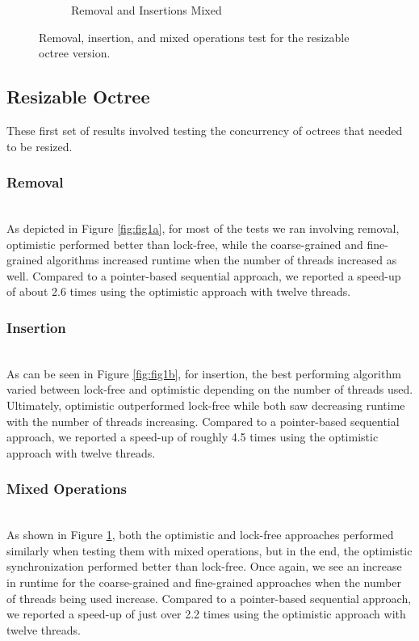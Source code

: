 \documentclass[conference]{IEEEtran}
\begin{document}
\begin{figure}[h!]
\begin{subfigure}{.5\textwidth}
		\caption{Removal and Insertions Mixed}
		\label{fig:fig1c}
	\end{subfigure}
    \caption{Removal, insertion, and mixed operations test for the resizable octree version.}
    \label{fig:fig1}
    
\end{figure}

\subsection{Resizable Octree} %
These first set of results involved testing the concurrency of octrees that needed to be resized.
\subsubsection{Removal}~\\
\indent \indent As depicted in Figure \ref{fig:fig1a}, for most of the tests we ran involving removal, optimistic performed better than lock-free, while the coarse-grained and fine-grained algorithms increased runtime when the number of threads increased as well. Compared to a pointer-based sequential approach, we reported a speed-up of about 2.6 times using the optimistic approach with twelve threads.

\subsubsection{Insertion}~\\
\indent \indent As can be seen in Figure \ref{fig:fig1b}, for insertion, the best performing algorithm varied between lock-free and optimistic depending on the number of threads used. Ultimately, optimistic outperformed lock-free while both saw decreasing runtime with the number of threads increasing. Compared to a pointer-based sequential approach, we reported a speed-up of roughly 4.5 times using the optimistic approach with twelve threads.

\subsubsection{Mixed Operations}~\\
\indent \indent As shown in Figure \ref{fig:fig1c}, both the optimistic and lock-free approaches performed similarly when testing them with mixed operations, but in the end, the optimistic synchronization performed better than lock-free. Once again, we see an increase in runtime for the coarse-grained and fine-grained approaches when the number of threads being used increase. Compared to a pointer-based sequential approach, we reported a speed-up of just over 2.2 times using the optimistic approach with twelve threads.
\end{document}
